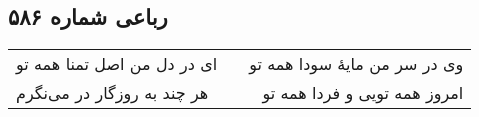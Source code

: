 \begin{center}
\section*{رباعی شماره ۵۸۶}
\label{sec:sh586}
\begin{longtable}{l p{0.5cm} r}
ای در دل من اصل تمنا همه تو
&&
وی در سر من مایهٔ سودا همه تو
\\
هر چند به روزگار در می‌نگرم
&&
امروز همه تویی و فردا همه تو
\\
\end{longtable}
\end{center}
